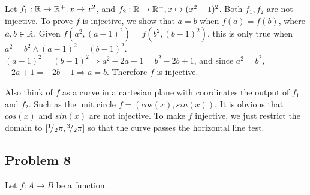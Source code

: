 \documentclass[11pt]{article}
\begin{document}
\begin{solution}
  $ $\\
  Let $f_1: \mathbb{R} \to \mathbb{R}^+, x \mapsto x^2$, and $f_2: \mathbb{R} \to \mathbb{R}^+, x\mapsto (x^2-1)^2$. Both $f_1, f_2$ are not injective. To prove $f$ is injective, we show that $a = b$ when $f(a) = f(b)$, where $a,b\in \mathbb{R}$. Given $f(a^2, (a-1)^2) = f(b^2, (b-1)^2)$, this is only true when $a^2 = b^2 \land (a-1)^2=(b-1)^2$. $(a-1)^2=(b-1)^2 \Rightarrow a^2 -2a + 1 = b^2 -2b + 1$, and since $a^2 = b^2$, $-2a + 1 = -2b + 1 \Rightarrow a = b$. Therefore $f$ is injective.

  \begin{rem}
    Also think of $f$ as a curve in a cartesian plane with coordinates the output of $f_1$ and $f_2$. Such as the unit circle $f=(cos(x), sin(x))$. It is obvious that $cos(x)$ and $sin(x)$ are not injective. To make $f$ injective, we just restrict the domain to $[{}^{1}\!/_{2}\pi, {}^{3}\!/_{2}\pi]$ so that the curve passes the horizontal line test.
    \begin{center}
    \end{center}
  \end{rem}
\end{solution}

\subsection*{Problem 8}
Let $f: A\to B$ be a function.
\end{document}
